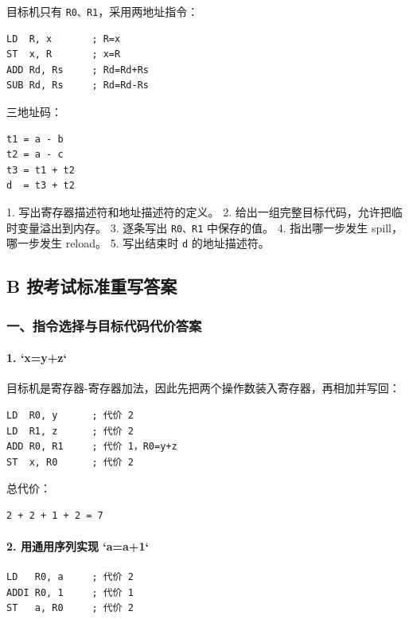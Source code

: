 \documentclass[UTF8]{ctexart}
\begin{document}
目标机只有 \texttt{R0、R1}，采用两地址指令：

\begin{Verbatim}[fontsize=\small,breaklines=true]
LD  R, x       ; R=x
ST  x, R       ; x=R
ADD Rd, Rs     ; Rd=Rd+Rs
SUB Rd, Rs     ; Rd=Rd-Rs
\end{Verbatim}

三地址码：

\begin{Verbatim}[fontsize=\small,breaklines=true]
t1 = a - b
t2 = a - c
t3 = t1 + t2
d  = t3 + t2
\end{Verbatim}

1. 写出寄存器描述符和地址描述符的定义。 2. 给出一组完整目标代码，允许把临时变量溢出到内存。 3. 逐条写出 \texttt{R0、R1} 中保存的值。 4. 指出哪一步发生 spill，哪一步发生 reload。 5. 写出结束时 \texttt{d} 的地址描述符。

\subsection*{B 按考试标准重写答案}

\subsubsection*{一、指令选择与目标代码代价答案}

\paragraph*{1. `x=y+z`}

目标机是寄存器-寄存器加法，因此先把两个操作数装入寄存器，再相加并写回：

\begin{Verbatim}[fontsize=\small,breaklines=true]
LD  R0, y      ; 代价 2
LD  R1, z      ; 代价 2
ADD R0, R1     ; 代价 1，R0=y+z
ST  x, R0      ; 代价 2
\end{Verbatim}

总代价：

\begin{Verbatim}[fontsize=\small,breaklines=true]
2 + 2 + 1 + 2 = 7
\end{Verbatim}

\paragraph*{2. 用通用序列实现 `a=a+1`}

\begin{Verbatim}[fontsize=\small,breaklines=true]
LD   R0, a     ; 代价 2
ADDI R0, 1     ; 代价 1
ST   a, R0     ; 代价 2
\end{Verbatim}
\end{document}
